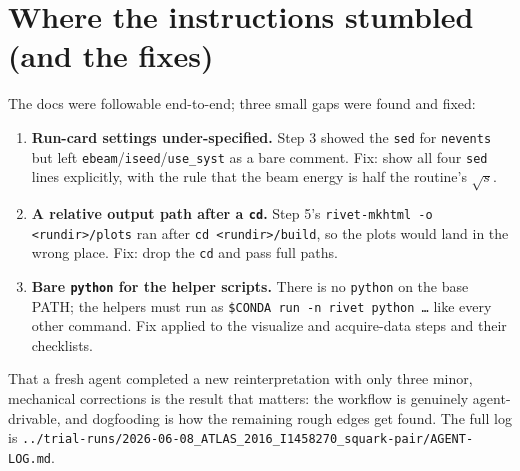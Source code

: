 \documentclass[11pt,oneside]{report}
\newcommand{\code}[1]{\texttt{#1}}
\begin{document}
\section{Where the instructions stumbled (and the fixes)}
The docs were followable end-to-end; three small gaps were found and fixed:
\begin{enumerate}[nosep]
  \item \textbf{Run-card settings under-specified.} Step 3 showed the \code{sed} for \code{nevents} but
        left \code{ebeam}/\code{iseed}/\code{use\_syst} as a bare comment. Fix: show all four \code{sed}
        lines explicitly, with the rule that the beam energy is half the routine's $\sqrt s$.
  \item \textbf{A relative output path after a \code{cd}.} Step 5's \code{rivet-mkhtml -o <rundir>/plots}
        ran after \code{cd <rundir>/build}, so the plots would land in the wrong place. Fix: drop the
        \code{cd} and pass full paths.
  \item \textbf{Bare \code{python} for the helper scripts.} There is no \code{python} on the base PATH;
        the helpers must run as \code{\$CONDA run -n rivet python …} like every other command. Fix
        applied to the visualize and acquire-data steps and their checklists.
\end{enumerate}
That a fresh agent completed a new reinterpretation with only three minor, mechanical corrections is
the result that matters: the workflow is genuinely agent-drivable, and dogfooding is how the remaining
rough edges get found. The full log is \code{../trial-runs/2026-06-08\_ATLAS\_2016\_I1458270\_squark-pair/AGENT-LOG.md}.

\end{document}
